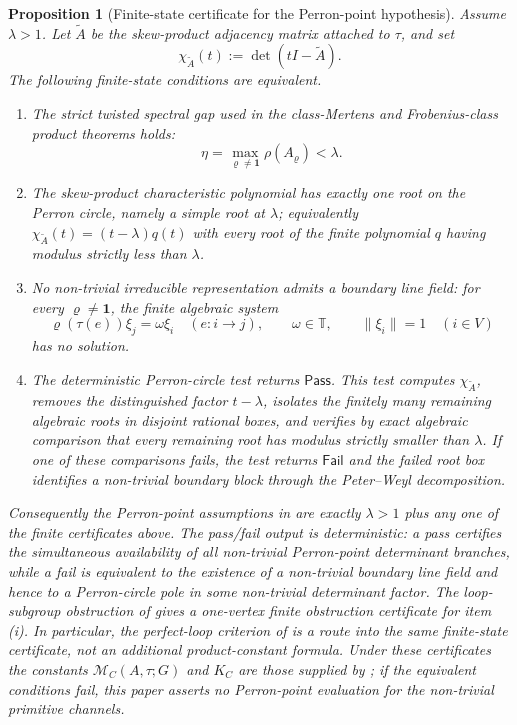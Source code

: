 \documentclass[11pt,a4paper]{amsart}
\theoremstyle{plain}
\newtheorem{proposition}[theorem]{Proposition}
\theoremstyle{definition}
\theoremstyle{remark}
\newcommand{\TT}{\mathbb{T}}
\newcommand{\norm}[1]{\lVert #1 \rVert}
\begin{document}
\begin{proposition}[Finite-state certificate for the Perron-point
  hypothesis]
  \label{prop:eta-gap-finite-state-certificate}
  Assume \(\lambda>1\). Let \(\widetilde A\) be the skew-product
  adjacency matrix attached to \(\tau\), and set
  \[
    \chi_{\widetilde A}(t):=\det(tI-\widetilde A).
  \]
  The following finite-state conditions are equivalent.
  \begin{enumerate}[label=\rm(\roman*)]
  \item The strict twisted spectral gap used in the class-Mertens and
    Frobenius-class product theorems holds:
    \[
      \eta=\max_{\varrho\neq\mathbf 1}\rho(A_\varrho)<\lambda .
    \]
  \item The skew-product characteristic polynomial has exactly one root on
    the Perron circle, namely a simple root at \(\lambda\); equivalently
    \(\chi_{\widetilde A}(t)=(t-\lambda)q(t)\) with every root of the
    finite polynomial \(q\) having modulus strictly less than \(\lambda\).
  \item No non-trivial irreducible representation admits a boundary line
    field: for every \(\varrho\neq\mathbf1\), the finite algebraic system
    \[
      \varrho(\tau(e))\xi_j=\omega\xi_i\quad(e:i\to j),
      \qquad \omega\in\TT,
      \qquad \norm{\xi_i}=1\quad(i\in V)
    \]
    has no solution.
  \item The deterministic Perron-circle test returns \(\mathsf{Pass}\).  This
    test computes \(\chi_{\widetilde A}\), removes the distinguished factor
    \(t-\lambda\), isolates the finitely many remaining algebraic roots in
    disjoint rational boxes, and verifies by exact algebraic comparison that
    every remaining root has modulus strictly smaller than \(\lambda\).  If
    one of these comparisons fails, the test returns \(\mathsf{Fail}\) and the
    failed root box identifies a non-trivial boundary block through the
    Peter--Weyl decomposition.
  \end{enumerate}
  Consequently the Perron-point assumptions in
   are
  exactly \(\lambda>1\) plus any one of the finite certificates above.
  The pass/fail output is deterministic: a pass certifies the simultaneous
  availability of all non-trivial Perron-point determinant branches, while a
  fail is equivalent to the existence of a non-trivial boundary line field and
  hence to a Perron-circle pole in some non-trivial determinant factor.
  The loop-subgroup obstruction of
   gives a one-vertex finite
  obstruction certificate for item \rm(i).  In particular, the perfect-loop
  criterion of  is a route into the same
  finite-state certificate, not an additional product-constant
  formula.
  Under these certificates the constants
  \(\mathcal M_C(A,\tau;G)\) and \(K_C\) are those supplied by
  ; if the
  equivalent conditions fail, this paper asserts no Perron-point
  evaluation for the non-trivial primitive channels.
\end{proposition}
\end{document}
